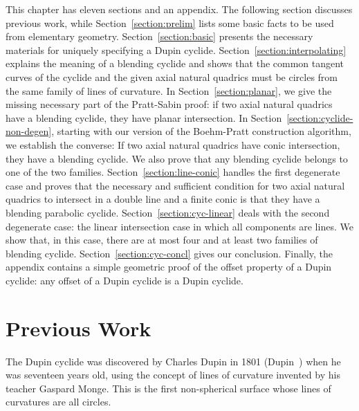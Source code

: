      This chapter has eleven sections and an appendix.  
The following section discusses 
previous work, while Section~\ref{section:prelim} lists some basic facts
to be used from elementary geometry.  Section~\ref{section:basic} presents
the necessary materials for uniquely specifying a Dupin cyclide.
Section~\ref{section:interpolating} explains the meaning of a blending
cyclide and shows that the common tangent curves of the cyclide and 
the given axial natural quadrics must be circles from the same family of
lines of curvature.
In Section~\ref{section:planar}, we give the missing necessary part of the
Pratt-Sabin proof: if two axial natural quadrics have a blending cyclide,
they have planar intersection.
In Section~\ref{section:cyclide-non-degen}, starting with our version of the 
Boehm-Pratt construction algorithm, we establish the converse:
If two axial natural quadrics have conic intersection,
they have a blending cyclide.  We also prove that any blending 
cyclide belongs to one of the two families.
Section~\ref{section:line-conic} handles the first  degenerate case and proves 
that the necessary and sufficient condition for two axial natural quadrics to
intersect in a double line and a finite conic is that they have a
blending parabolic cyclide.  
Section~\ref{section:cyc-linear} deals with the second degenerate case: the
linear intersection case in which all components are lines.  We show that,
in this case, there are at most four and at least two families of blending
cyclide. Section~\ref{section:cyc-concl} gives our conclusion.
Finally, the appendix contains a simple geometric proof of the offset property
of a Dupin cyclide: any offset of a Dupin cyclide is a Dupin cyclide.


\section{Previous Work}
\label{section:cyc-prev}

      The Dupin cyclide was discovered by Charles Dupin in 1801 
(Dupin~\cite{dupin:1822}) when he was seventeen years old, using the concept of
lines of curvature invented by his teacher Gaspard Monge.  
This is the first non-spherical surface whose lines of curvatures are all 
circles.

